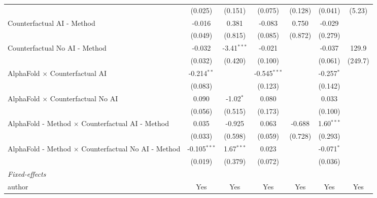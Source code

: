 \begin{tabular}{lcccccc}
                                                              & (0.025)        & (0.151)       & (0.075)        & (0.128)     & (0.041)       & (5.23)\\   
   Counterfactual AI - Method                                 & -0.016         & 0.381         & -0.083         & 0.750       & -0.029        &   \\   
                                                              & (0.049)        & (0.815)       & (0.085)        & (0.872)     & (0.279)       &   \\   
   Counterfactual No AI - Method                              & -0.032         & -3.41$^{***}$ & -0.021         &             & -0.037        & 129.9\\   
                                                              & (0.032)        & (0.420)       & (0.100)        &             & (0.061)       & (249.7)\\   
   AlphaFold $\times$ Counterfactual AI                       & -0.214$^{**}$  &               & -0.545$^{***}$ &             & -0.257$^{*}$  &   \\   
                                                              & (0.083)        &               & (0.123)        &             & (0.142)       &   \\   
   AlphaFold $\times$ Counterfactual No AI                    & 0.090          & -1.02$^{*}$   & 0.080          &             & 0.033         &   \\   
                                                              & (0.056)        & (0.515)       & (0.173)        &             & (0.100)       &   \\   
   AlphaFold - Method $\times$ Counterfactual AI - Method     & 0.035          & -0.925        & 0.063          & -0.688      & 1.60$^{***}$  &   \\   
                                                              & (0.033)        & (0.598)       & (0.059)        & (0.728)     & (0.293)       &   \\   
   AlphaFold - Method $\times$ Counterfactual No AI - Method  & -0.105$^{***}$ & 1.67$^{***}$  & 0.023          &             & -0.071$^{*}$  &   \\   
                                                              & (0.019)        & (0.379)       & (0.072)        &             & (0.036)       &   \\   
   \midrule
   \emph{Fixed-effects}\\
   author                                                     & Yes            & Yes           & Yes            & Yes         & Yes           & Yes\\  

\end{tabular}
